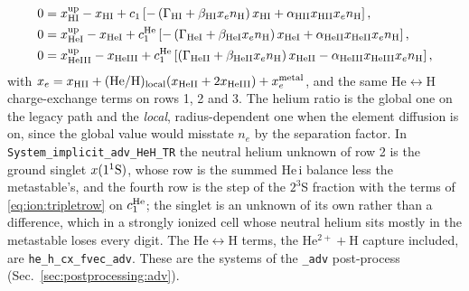\begin{align}
0 &= x^{\rm up}_{\rm HI}-x_{\rm HI}
   + c_1\left[-\left(\Gamma_{\rm HI}+\beta_{\rm HI}x_e n_{\rm H}\right)x_{\rm HI}
              + \alpha_{\rm HII}x_{\rm HII}x_e n_{\rm H}\right],
   \label{eq:ion:advh}\\
0 &= x^{\rm up}_{\rm HeI}-x_{\rm HeI}
   + c_1^{\rm He}\left[-\left(\Gamma_{\rm HeI}+\beta_{\rm HeI}x_e n_{\rm H}\right)x_{\rm HeI}
              + \alpha_{\rm HeII}x_{\rm HeII}x_e n_{\rm H}\right],
   \label{eq:ion:advhe}\\
0 &= x^{\rm up}_{\rm HeIII}-x_{\rm HeIII}
   + c_1^{\rm He}\left[\left(\Gamma_{\rm HeII}+\beta_{\rm HeII}x_e n_{\rm H}\right)x_{\rm HeII}
              - \alpha_{\rm HeIII}x_{\rm HeIII}x_e n_{\rm H}\right],
   \label{eq:ion:advhe2}
\end{align}
with $x_e = x_{\rm HII} + ({\rm He/H})_{\rm local}(x_{\rm HeII}+2x_{\rm HeIII})
+ x_e^{\rm metal}$, and the same He$\leftrightarrow$H charge-exchange terms
on rows 1, 2 and 3. The helium ratio is the global one on the legacy path and
the \emph{local}, radius-dependent one when the element diffusion is on,
since the global value would misstate $n_e$ by the separation factor. In
\texttt{System\_implicit\_adv\_HeH\_TR} the neutral helium unknown of row 2
is the ground singlet $x(1^1{\rm S})$, whose row is the summed He\,{\sc i}
balance less the metastable's, and the fourth row is the step of the $2^3$S
fraction with the terms of \eqref{eq:ion:tripletrow} on $c_1^{\rm He}$; the
singlet is an unknown of its own rather than a difference, which in a
strongly ionized cell whose neutral helium sits mostly in the metastable
loses every digit. The He$\leftrightarrow$H terms, the He$^{2+}+$H capture
included, are \texttt{he\_h\_cx\_fvec\_adv}. These
are the systems of the \texttt{\_adv} post-process
(Sec.~\ref{sec:postprocessing:adv}).

